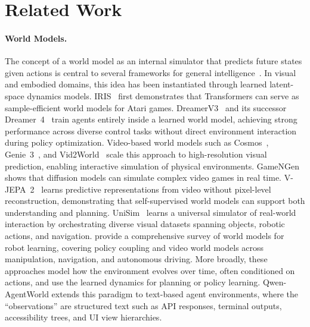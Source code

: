 \documentclass{llmxive}
\providecommand{\method}{Qwen-AgentWorld\xspace}
\begin{document}
\section{Related Work}
\label{sec:related}

\paragraph{World Models.}
The concept of a world model as an internal simulator that predicts future states given actions is central to several frameworks for general intelligence~\citep{lecun2022path, hafner2023mastering, yang2026world, delgrange2026foundation}.
In visual and embodied domains, this idea has been instantiated through learned latent-space dynamics models.
IRIS~\citep{micheli2022transformers} first demonstrates that Transformers can serve as sample-efficient world models for Atari games.
DreamerV3~\citep{hafner2023mastering} and its successor Dreamer~4~\citep{hafner2025training} train agents entirely inside a learned world model, achieving strong performance across diverse control tasks without direct environment interaction during policy optimization.
Video-based world models such as Cosmos~\citep{ali2025world}, Genie~3~\citep{genie3}, and Vid2World~\citep{huang2025vid2world} scale this approach to high-resolution visual prediction, enabling interactive simulation of physical environments.
GameNGen~\citep{valevski2025diffusion} shows that diffusion models can simulate complex video games in real time.
V-JEPA~2~\citep{assran2025v} learns predictive representations from video without pixel-level reconstruction, demonstrating that self-supervised world models can support both understanding and planning.
UniSim~\citep{yang2023learning} learns a universal simulator of real-world interaction by orchestrating diverse visual datasets spanning objects, robotic actions, and navigation.
\citet{hou2026world} provide a comprehensive survey of world models for robot learning, covering policy coupling and video world models across manipulation, navigation, and autonomous driving.
More broadly, these approaches model how the environment evolves over time, often conditioned on actions, and use the learned dynamics for planning or policy learning.
\method extends this paradigm to text-based agent environments, where the ``observations'' are structured text such as API responses, terminal outputs, accessibility trees, and UI view hierarchies.
\end{document}
